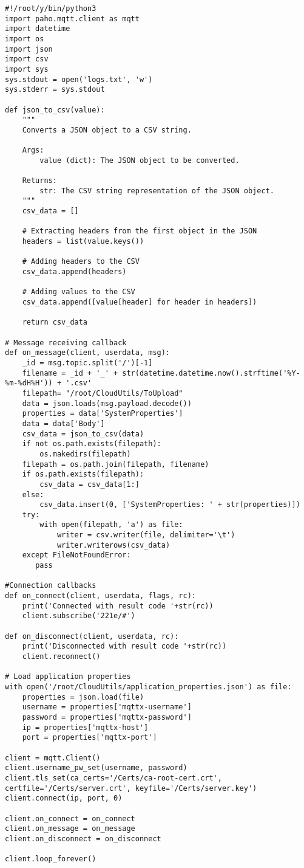 \begin{verbatim}
#!/root/y/bin/python3
import paho.mqtt.client as mqtt
import datetime
import os
import json
import csv
import sys
sys.stdout = open('logs.txt', 'w')
sys.stderr = sys.stdout

def json_to_csv(value):
    """
    Converts a JSON object to a CSV string.
    
    Args:
        value (dict): The JSON object to be converted.
    
    Returns:
        str: The CSV string representation of the JSON object.
    """
    csv_data = []
    
    # Extracting headers from the first object in the JSON
    headers = list(value.keys())
    
    # Adding headers to the CSV
    csv_data.append(headers)
    
    # Adding values to the CSV
    csv_data.append([value[header] for header in headers])

    return csv_data

# Message receiving callback
def on_message(client, userdata, msg):
    _id = msg.topic.split('/')[-1]
    filename = _id + '_' + str(datetime.datetime.now().strftime('%Y-%m-%dH%H')) + '.csv'
    filepath= "/root/CloudUtils/ToUpload"
    data = json.loads(msg.payload.decode())
    properties = data['SystemProperties']
    data = data['Body']
    csv_data = json_to_csv(data)
    if not os.path.exists(filepath):
        os.makedirs(filepath)
    filepath = os.path.join(filepath, filename)
    if os.path.exists(filepath):
        csv_data = csv_data[1:]
    else:
        csv_data.insert(0, ['SystemProperties: ' + str(properties)])
    try:
        with open(filepath, 'a') as file:
            writer = csv.writer(file, delimiter='\t')
            writer.writerows(csv_data)
    except FileNotFoundError:
       pass

#Connection callbacks
def on_connect(client, userdata, flags, rc):
    print('Connected with result code '+str(rc))
    client.subscribe('221e/#')

def on_disconnect(client, userdata, rc):
    print('Disconnected with result code '+str(rc))
    client.reconnect()

# Load application properties
with open('/root/CloudUtils/application_properties.json') as file:
    properties = json.load(file)
    username = properties['mqttx-username']
    password = properties['mqttx-password']
    ip = properties['mqttx-host']
    port = properties['mqttx-port']

client = mqtt.Client()
client.username_pw_set(username, password)
client.tls_set(ca_certs='/Certs/ca-root-cert.crt', certfile='/Certs/server.crt', keyfile='/Certs/server.key')
client.connect(ip, port, 0)

client.on_connect = on_connect
client.on_message = on_message
client.on_disconnect = on_disconnect

client.loop_forever()
\end{verbatim}

